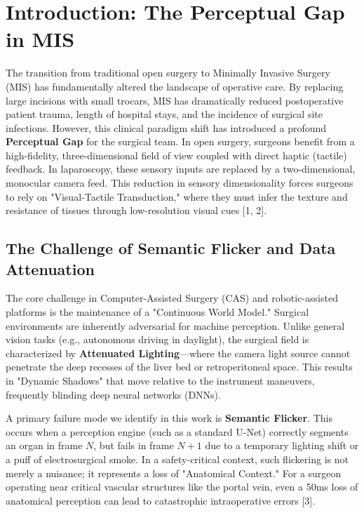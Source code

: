 \documentclass[conference]{IEEEtran}
\begin{document}
\section{Introduction: The Perceptual Gap in MIS}
The transition from traditional open surgery to Minimally Invasive Surgery (MIS) has fundamentally altered the landscape of operative care. By replacing large incisions with small trocars, MIS has dramatically reduced postoperative patient trauma, length of hospital stays, and the incidence of surgical site infections. However, this clinical paradigm shift has introduced a profound \textbf{Perceptual Gap} for the surgical team. In open surgery, surgeons benefit from a high-fidelity, three-dimensional field of view coupled with direct haptic (tactile) feedback. In laparoscopy, these sensory inputs are replaced by a two-dimensional, monocular camera feed. This reduction in sensory dimensionality forces surgeons to rely on "Visual-Tactile Transduction," where they must infer the texture and resistance of tissues through low-resolution visual cues [1, 2].

\subsection{The Challenge of Semantic Flicker and Data Attenuation}
The core challenge in Computer-Assisted Surgery (CAS) and robotic-assisted platforms is the maintenance of a "Continuous World Model." Surgical environments are inherently adversarial for machine perception. Unlike general vision tasks (e.g., autonomous driving in daylight), the surgical field is characterized by \textbf{Attenuated Lighting}—where the camera light source cannot penetrate the deep recesses of the liver bed or retroperitoneal space. This results in "Dynamic Shadows" that move relative to the instrument maneuvers, frequently blinding deep neural networks (DNNs).

A primary failure mode we identify in this work is \textbf{Semantic Flicker}. This occurs when a perception engine (such as a standard U-Net) correctly segments an organ in frame $N$, but fails in frame $N+1$ due to a temporary lighting shift or a puff of electrosurgical smoke. In a safety-critical context, such flickering is not merely a nuisance; it represents a loss of "Anatomical Context." For a surgeon operating near critical vascular structures like the portal vein, even a 50ms loss of anatomical perception can lead to catastrophic intraoperative errors [3]. 
\end{document}
